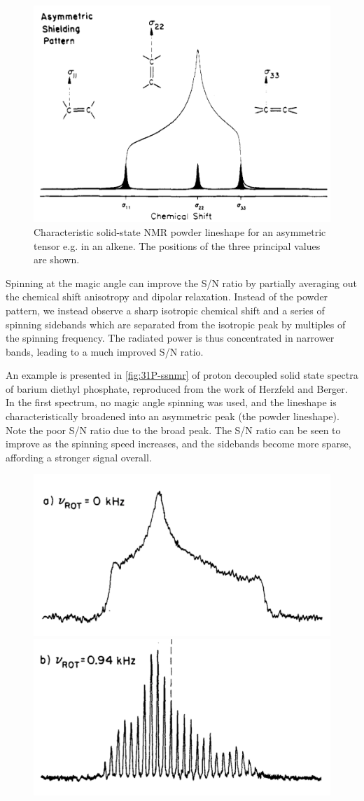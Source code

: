 \begin{refsection}
\begin{figure}
  \centering
  \includegraphics[width=0.45\linewidth]{Figures/ssnmr-tensor.pdf}
  \caption[SSNMR powder lineshape]{Characteristic solid-state NMR powder lineshape for an asymmetric tensor e.g. in an alkene. The positions of the three principal values are shown.}
  \label{fig:ssnmr-tensor}
\end{figure}

Spinning at the magic angle can improve the S/N ratio by partially averaging out the chemical shift anisotropy and dipolar relaxation.
Instead of the powder pattern, we instead observe a sharp isotropic chemical shift and a series of spinning sidebands which are separated from the isotropic peak by multiples of the spinning frequency.
The radiated power is thus concentrated in narrower bands, leading to a much improved S/N ratio.

An example is presented in \cref{fig:31P-ssnmr} of proton decoupled solid state  spectra of barium diethyl phosphate, reproduced from the work of Herzfeld and Berger\autocite{Herzfeld1980SidebandAngle}.
In the first spectrum, no magic angle spinning was used, and the lineshape is characteristically broadened into an asymmetric peak (the powder lineshape).
Note the poor S/N ratio due to the broad peak.
The S/N ratio can be seen to improve as the spinning speed increases, and the sidebands become more sparse, affording a stronger signal overall.

\begin{figure}
    \centering
    \includegraphics[width=0.45\linewidth]{Figures/31P-ssnmr-0khz.pdf}
    \includegraphics[width=0.45\linewidth]{Figures/31P-ssnmr-0.94khz.pdf}


\end{figure}
\end{refsection}
